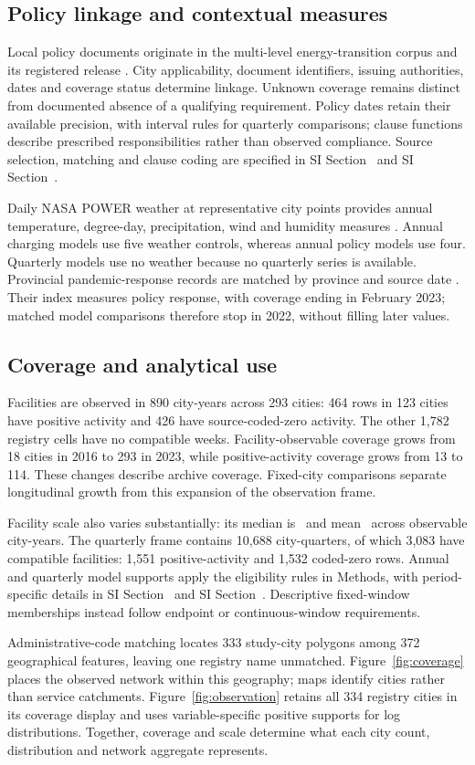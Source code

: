 \subsection{Policy linkage and contextual measures}
Local policy documents originate in the multi-level energy-transition corpus and its registered release \citep{zhaopaper2026,zhao2026}. City applicability, document identifiers, issuing authorities, dates and coverage status determine linkage. Unknown coverage remains distinct from documented absence of a qualifying requirement. Policy dates retain their available precision, with interval rules for quarterly comparisons; clause functions describe prescribed responsibilities rather than observed compliance. Source selection, matching and clause coding are specified in SI Section~ and SI Section~.

Daily NASA POWER weather at representative city points provides annual temperature, degree-day, precipitation, wind and humidity measures \citep{nasapower}. Annual charging models use five weather controls, whereas annual policy models use four. Quarterly models use no weather because no quarterly series is available. Provincial pandemic-response records are matched by province and source date \citep{hale2021}. Their index measures policy response, with coverage ending in February 2023; matched model comparisons therefore stop in 2022, without filling later values.

\subsection{Coverage and analytical use}
Facilities are observed in 890 city-years across 293 cities: 464 rows in 123 cities have positive activity and 426 have source-coded-zero activity. The other 1,782 registry cells have no compatible weeks. Facility-observable coverage grows from 18 cities in 2016 to 293 in 2023, while positive-activity coverage grows from 13 to 114. These changes describe archive coverage. Fixed-city comparisons separate longitudinal growth from this expansion of the observation frame.

Facility scale also varies substantially: its median is \FacilityMedian\ and mean \FacilityMean\ across observable city-years. The quarterly frame contains 10,688 city-quarters, of which 3,083 have compatible facilities: 1,551 positive-activity and 1,532 coded-zero rows. Annual and quarterly model supports apply the eligibility rules in Methods, with period-specific details in SI Section~ and SI Section~. Descriptive fixed-window memberships instead follow endpoint or continuous-window requirements.

Administrative-code matching locates 333 study-city polygons among 372 geographical features, leaving one registry name unmatched. Figure~\ref{fig:coverage} places the observed network within this geography; maps identify cities rather than service catchments. Figure~\ref{fig:observation} retains all 334 registry cities in its coverage display and uses variable-specific positive supports for log distributions. Together, coverage and scale determine what each city count, distribution and network aggregate represents.


